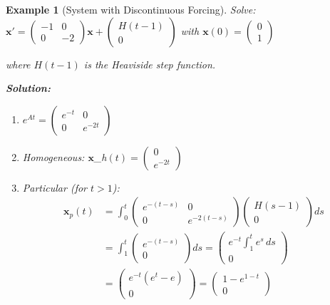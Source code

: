 \documentclass[12pt]{article}
\newtheorem{example}{Example}
\begin{document}
\begin{example}[System with Discontinuous Forcing]
Solve: $\mathbf{x}' = \begin{pmatrix} -1 & 0 \\ 0 & -2 \end{pmatrix}\mathbf{x} + \begin{pmatrix} H(t-1) \\ 0 \end{pmatrix}$ with $\mathbf{x}(0) = \begin{pmatrix} 0 \\ 1 \end{pmatrix}$

where $H(t-1)$ is the Heaviside step function.

\textbf{Solution:}
\begin{enumerate}
\item $e^{At} = \begin{pmatrix} e^{-t} & 0 \\ 0 & e^{-2t} \end{pmatrix}$

\item Homogeneous: $\mathbf{x}$_{h}$(t) = \begin{pmatrix} 0 \\ e^{-2t} \end{pmatrix}$

\item Particular (for $t > 1$):
\begin{align}
\mathbf{x}_{p}(t) &= \int_{0}^t \begin{pmatrix} e^{-(t-s)} & 0 \\ 0 & e^{-2(t-s)} \end{pmatrix}\begin{pmatrix} H(s-1) \\ 0 \end{pmatrix}ds \\
&= \int_{1}^t \begin{pmatrix} e^{-(t-s)} \\ 0 \end{pmatrix}ds = \begin{pmatrix} e^{-t}\int_{1}^t e^{s}\,ds \\ 0 \end{pmatrix} \\
&= \begin{pmatrix} e^{-t}(e^{t} - e) \\ 0 \end{pmatrix} = \begin{pmatrix} 1 - e^{1-t} \\ 0 \end{pmatrix}
\end{align}


\end{enumerate}
\end{example}
\end{document}
